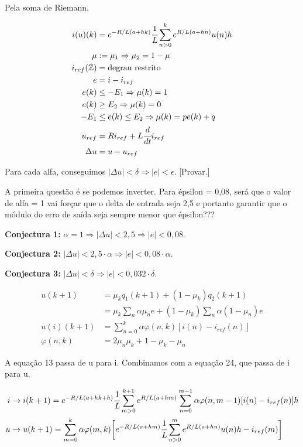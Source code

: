 \documentclass[12pt]{article}
\begin{document}
Pela soma de Riemann,

\begin{align}
  i(u)(k) &= e^{-R/L (a + hk)}\cfrac{1}{L}\sum_{n > 0}^k e^{R/L (a + hn)} u(n) h \\  \mu &:= \mu_1 \Rightarrow \mu_2 = 1 - \mu \\
  i_{ref}(\mathbb{Z}) &= \text{degrau restrito} \\
  e &= i - i_{ref} \\
  e(k) &\le - E_1 \Rightarrow \mu(k) = 1 \\
  e(k) &\ge E_2 \Rightarrow \mu(k) = 0 \\
  - E_1 &\le e(k) \le E_2 \Rightarrow \mu(k) = p e(k) + q \\
  u_{ref} &= R i_{ref} + L \cfrac{d}{dt} i_{ref} \\
  \Delta u &= u - u_{ref}
\end{align}

Para cada alfa, conseguimos $| \Delta u | < \delta \Rightarrow | e | < \epsilon$. [Provar.]

A primeira quest\~ao \'e se podemos inverter. Para \'epsilon = 0,08, ser\'a que o valor de alfa = 1 vai for\c{c}ar que o delta de entrada seja 2,5 e portanto garantir que o m\'odulo do erro de sa\'ida seja sempre menor que \'epsilon???

\textbf{Conjectura 1: }$\alpha = 1 \Rightarrow |\Delta u| < 2,5 \Rightarrow |e| < 0,08$.

\textbf{Conjectura 2: }$ |\Delta u| < 2,5\cdot \alpha \Rightarrow |e| < 0,08\cdot \alpha $.

\textbf{Conjectura 3: }$ |\Delta u| < \delta \Rightarrow |e| < 0,032\cdot \delta$.

\begin{align}
u(k+1) &= \mu_k q_1(k+1) + (1 - \mu_k) q_2(k+1) \\
&= \mu_k \sum_n \alpha \mu_n e + (1 - \mu_k) \sum_n \alpha (1 - \mu_n) e \\
u(i)(k+1) &= \sum_{n = 0}^k \alpha \varphi(n,k) [i(n) - i_{ref}(n)] \\
\varphi(n, k) &= 2 \mu_n \mu_k + 1 - \mu_k - \mu_n
\end{align}

A equa\c{c}\~ao 13 passa de u para i. Combinamos com a equa\c{c}\~ao 24, que passa de i para u.

\begin{align}
i &\to i(k+ 1) = e^{-R/L (a + hk + h)}\cfrac{1}{L}\sum_{m > 0}^{k + 1} e^{R/L (a + hm)}  \sum_{n = 0}^{m - 1} \alpha \varphi(n,m-1) [i(n) - i_{ref}(n)] h \\
u &\to u(k + 1) = \sum_{m = 0}^k \alpha \varphi(m,k) \bigg[e^{-R/L (a + hm)}\cfrac{1}{L}\sum_{n > 0}^m e^{R/L (a + hn)} u(n) h - i_{ref}(m)\bigg]
\end{align}
\end{document}
